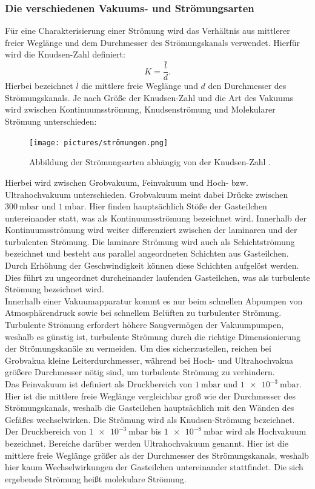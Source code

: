 \subsubsection*{Die verschiedenen Vakuums- und Strömungsarten}
Für eine Charakterisierung einer Strömung wird das Verhältnis aus mittlerer
freier Weglänge und dem Durchmesser des Strömungskanals verwendet. Hierfür wird die
Knudsen-Zahl definiert:
\begin{equation}
 K = \frac{\bar{l}}{d}.
\end{equation}
Hierbei bezeichnet $\bar{l}$ die mittlere freie Weglänge und $d$ den Durchmesser
des Strömungskanals. Je nach Größe der Knudsen-Zahl und die Art des Vakuums wird
zwischen Kontinuumsströmung, Knudsenströmung und Molekularer Strömung unterschieden:
\begin{figure}[H]
  \centering
  \texttt{[image: pictures/strömungen.png]}
  \label{fig:strömung}
  \caption{Abbildung der Strömungsarten abhängig von der Knudsen-Zahl \cite{pfeiffer}.}
\end{figure}
\noindent
Hierbei wird zwischen Grobvakuum, Feinvakuum und Hoch- bzw. Ultrahochvakuum unterschieden.
Grobvakuum meint dabei Drücke zwischen $\SI{300}{\milli\bar}$ und $\SI{1}{\milli\bar}$.
Hier finden hauptsächlich Stöße der Gasteilchen untereinander statt, was als Kontinuumsströmung
bezeichnet wird.
Innerhalb der Kontinuumsströmung wird weiter differenziert zwischen der laminaren
und der turbulenten Strömung. Die laminare Strömung wird auch als Schichtströmung
bezeichnet und besteht aus parallel angeordneten Schichten aus Gasteilchen. Durch
Erhöhung der Geschwindigkeit können diese Schichten aufgelöst werden. Dies führt
zu ungeordnet durcheinander laufenden Gasteilchen, was als turbulente Strömung
bezeichnet wird.\\
Innerhalb einer Vakuumapparatur kommt es nur beim schnellen Abpumpen von Atmosphärendruck
sowie bei schnellem Belüften zu turbulenter Strömung. Turbulente Strömung erfordert
höhere Saugvermögen der Vakuumpumpen, weshalb es günstig ist, turbulente Strömung durch
die richtige Dimensionierung der Strömungskanäle zu vermeiden. Um dies sicherzustellen,
reichen bei Grobvakua kleine Leiterdurchmesser, während bei Hoch- und Ultrahochvakua
größere Durchmesser nötig sind, um turbulente Strömung zu verhindern.\\
Das Feinvakuum ist definiert als Druckbereich von $\SI{1}{\milli\bar}$ und $\SI{1e-3}{\milli\bar}$.
Hier ist die mittlere freie Weglänge vergleichbar groß wie der Durchmesser des Strömungskanals,
weshalb die Gasteilchen hauptsächlich mit den Wänden des Gefäßes wechselwirken.
Die Strömung wird als Knudsen-Strömung bezeichnet.
Der Druckbereich von $\SI{1e-3}{\milli\bar}$ bis $\SI{1e-8}{\milli\bar}$ wird als Hochvakuum
bezeichnet. Bereiche darüber werden Ultrahochvakuum genannt. Hier ist die mittlere freie
Weglänge größer als der Durchmesser des Strömungskanals, weshalb hier kaum Wechselwirkungen
der Gasteilchen untereinander stattfindet. Die sich ergebende Strömung heißt molekulare Strömung.

